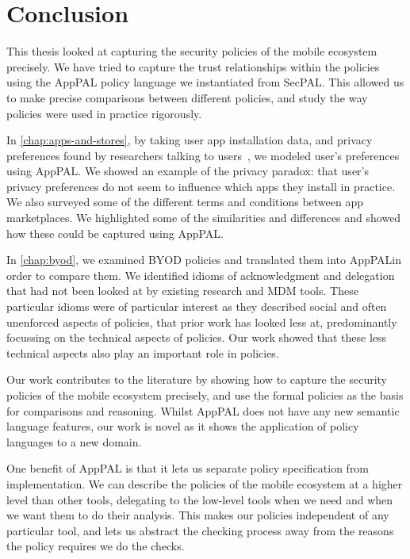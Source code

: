 \documentclass[thesis.tex]{subfiles}
\begin{document}
\chapter{Conclusion}

This thesis looked at capturing the security policies of the
mobile ecosystem precisely. We have tried to capture the trust
relationships within the policies using the AppPAL policy language we
instantiated from SecPAL. This allowed us to make precise comparisons
between different policies, and study the way policies were used in
practice rigorously.

In \autoref{chap:apps-and-stores}, by taking user app installation
data, and privacy preferences found by researchers talking to
users~\cite{lin_modeling_2014}, we modeled user's preferences using
AppPAL. We showed an example of the privacy paradox: that user's
privacy preferences do not seem to influence which apps they install
in practice.  We also surveyed some of the different terms and
conditions between app marketplaces.  We highlighted some of the
similarities and differences and showed how these could be captured
using AppPAL.

In \autoref{chap:byod}, we examined BYOD policies and translated them
into AppPALin order to compare them. We identified idioms of
acknowledgment and delegation that had not been looked at by existing
research and \ac{MDM} tools. These particular idioms were of
particular interest as they described social and often unenforced
aspects of policies, that prior work has looked less at, predominantly
focussing on the technical aspects of policies.  Our work showed that these less technical aspects also play an important role in policies.

Our work contributes to the literature by showing how to capture the
security policies of the mobile ecosystem precisely, and use the
formal policies as the basis for comparisons and reasoning. Whilst
AppPAL does not have any new semantic language features, our work is
novel as it shows the application of policy languages to a new domain.

One benefit of AppPAL is that it lets us separate policy specification
from implementation. We can describe the policies of the mobile
ecosystem at a higher level than other tools, delegating to the
low-level tools when we need and when we want them to do their
analysis. This makes our policies independent of any particular tool,
and lets us abstract the checking process away from the reasons the
policy requires we do the checks.
\end{document}
